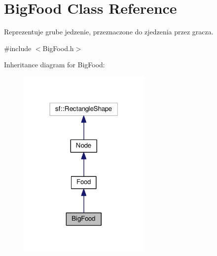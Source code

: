 \hypertarget{classBigFood}{}\section{Big\+Food Class Reference}
\label{classBigFood}


Reprezentuje grube jedzenie, przeznaczone do zjedzenia przez gracza.  




{\ttfamily \#include $<$Big\+Food.\+h$>$}



Inheritance diagram for Big\+Food\+:\nopagebreak
\begin{figure}[H]
\begin{center}
\leavevmode
\includegraphics[width=183pt]{classBigFood__inherit__graph}
\end{center}
\end{figure}


